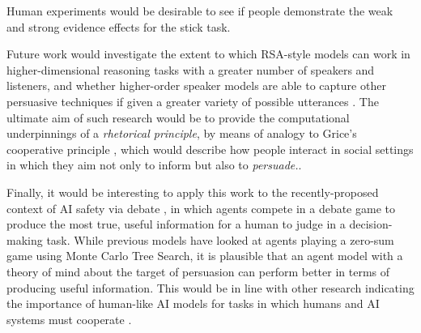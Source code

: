 \documentclass[10pt,letterpaper]{article}
\begin{document}
Human experiments would be desirable to see if people demonstrate the weak and strong evidence effects for the stick task.

Future work would investigate the extent to which RSA-style models can work in higher-dimensional reasoning tasks with
a greater number of speakers and listeners,
and whether higher-order speaker models are able to capture other persuasive techniques if given a greater variety of
possible utterances \cite{cialdini1993influence, falk_persuasion_2018}. The ultimate aim of such research would be to
provide the computational underpinnings of a \textit{rhetorical principle}, by means of analogy to Grice's cooperative 
principle \cite{grice_logic_1975}, which would describe how people interact in social settings in which they aim not
only to inform but also to \textit{persuade.}.

Finally, it would be interesting to apply this work to the recently-proposed context of AI safety via debate \cite{irving_ai_2018}, in which
agents compete in a debate game to produce the most true, useful information for a human to judge in a decision-making
task. While previous models have looked at agents playing a zero-sum game using Monte Carlo Tree Search, it is 
plausible that an agent model with a theory of mind about the target of persuasion can perform better in terms of producing
useful information. This would be in line with other research indicating the importance of human-like AI models for tasks in which
humans and AI systems must cooperate \cite{carroll2019utility, hilgard_learning_2019}.


\nocite{lawson-tancred_art_1991}



\setlength{\bibleftmargin}{.125in}
\setlength{\bibindent}{-\bibleftmargin}


\end{document}
